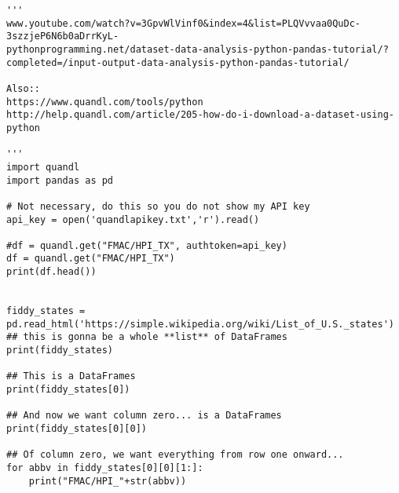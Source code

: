 \documentclass[11pt,a4paper]{article}
\begin{document}
\smallskip
\smallskip
\noindent 
\begin{lstlisting}
'''
www.youtube.com/watch?v=3GpvWlVinf0&index=4&list=PLQVvvaa0QuDc-3szzjeP6N6b0aDrrKyL-
pythonprogramming.net/dataset-data-analysis-python-pandas-tutorial/?completed=/input-output-data-analysis-python-pandas-tutorial/

Also::
https://www.quandl.com/tools/python
http://help.quandl.com/article/205-how-do-i-download-a-dataset-using-python

'''
import quandl
import pandas as pd

# Not necessary, do this so you do not show my API key
api_key = open('quandlapikey.txt','r').read()

#df = quandl.get("FMAC/HPI_TX", authtoken=api_key)
df = quandl.get("FMAC/HPI_TX")
print(df.head())


fiddy_states = pd.read_html('https://simple.wikipedia.org/wiki/List_of_U.S._states')
## this is gonna be a whole **list** of DataFrames
print(fiddy_states)

## This is a DataFrames
print(fiddy_states[0])

## And now we want column zero... is a DataFrames
print(fiddy_states[0][0])

## Of column zero, we want everything from row one onward...
for abbv in fiddy_states[0][0][1:]:
    print("FMAC/HPI_"+str(abbv))

\end{lstlisting}
\clearpage
\end{document}
